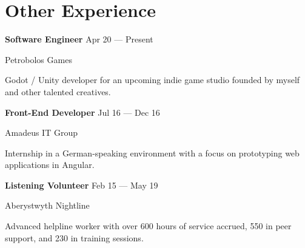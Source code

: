 \section{Other Experience}

\parbox[t][][t]{\linewidth}{
	\parbox{\linewidth}{\textbf{Software Engineer} \hfill {{Apr 20 --- Present}}}
	\parbox{\linewidth}{Petrobolos Games}
	\smallbreak
	\smallskip
	Godot / Unity developer for an upcoming indie game studio founded by myself and other talented creatives.
	\bigbreak
	\smallskip
}

\parbox[t][][t]{\linewidth}{
	\parbox{\linewidth}{\textbf{Front-End Developer} \hfill {{Jul 16 --- Dec 16}}}
	\parbox{\linewidth}{Amadeus IT Group}
	\smallbreak
	\smallskip
	Internship in a German-speaking environment with a focus on prototyping web applications in Angular.
	\bigbreak
	\smallskip
}



\parbox[t][][t]{\linewidth}{
	\parbox{\linewidth}{\textbf{Listening Volunteer} \hfill {{Feb 15 --- May 19}}}
	\parbox{\linewidth}{Aberystwyth Nightline}
	\smallbreak
	\smallskip
	Advanced helpline worker with over 600 hours of service accrued, 550 in peer support, and 230 in training sessions.
}

